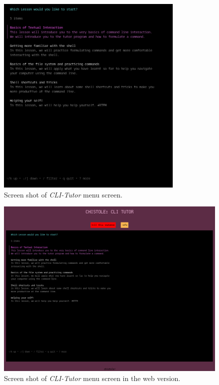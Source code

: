 \begin{figure}[htbp]
    \centering
    \includegraphics[width=0.8\textwidth]{img/climenu}
    \caption{Screen shot of \textit{CLI-Tutor} menu screen.}
    \label{fig:clitutormenu}
\end{figure}
\begin{figure}[htbp]
	\centering
	\includegraphics[width=1\textwidth]{img/cliwebfull}
	\caption{Screen shot of \textit{CLI-Tutor} menu screen in the web version.}
	\label{fig:webversion}
\end{figure}


